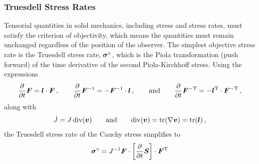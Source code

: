 \documentclass[10pt,letterpaper,oneside]{report}
\newcommand{\ten}[1]{\mbox{\boldmath $#1$}{}}
\newcommand{\scas}[1]{\mbox{{\scriptsize{${\rm{#1}}$}}}{}}
\begin{document}
\begin{itemize}
\subsubsection{Truesdell Stress Rates}
Tensorial quantities in solid mechanics, including stress and stress rates, must satisfy the criterion of objectivity, which means the quantities must remain unchanged regardless of the position of the observer.  The simplest objective stress rate is the Truesdell stress rate, $\ten{\sigma}^{\circ}$, which is the Piola transformation (push forward) of the time derivative of the second Piola-Kirchhoff stress.  Using the expressions 
\begin{equation}
\frac{\partial }{\partial t} \ten{F} = \ten{l} \cdot \ten{F} \, , 
\qquad  
\frac{\partial }{\partial t} \ten{F}^{-1} = - \ten{F}^{-1} \cdot \ten{l} \, , 
\qquad \mbox{and} \qquad
\frac{\partial }{\partial t} \ten{F}^{-\scas{T}} = - \ten{l}^{\scas{T}} \cdot \ten{F}^{-\scas{T}} \, , 
\end{equation}
along with
\begin{equation}
\dot{J} = J \, \mbox{div} (\ten{v}) 
\qquad \mbox{and} \qquad 
\mbox{div} (\ten{v}) = \mbox{tr} (\nabla \ten{v} ) = \mbox{tr} (\ten{l}) \, , 
\end{equation}
the Truesdell stress rate of the Cauchy stress simplifies to
\begin{align}
\ten{\sigma}^{\circ } ={}& J^{-1} \ten{F} \cdot \left[ \frac{\partial }{\partial t} \ten{S} \right] \cdot \ten{F}^{\scas{T}}
\\

\end{align}
\end{itemize}
\end{document}
